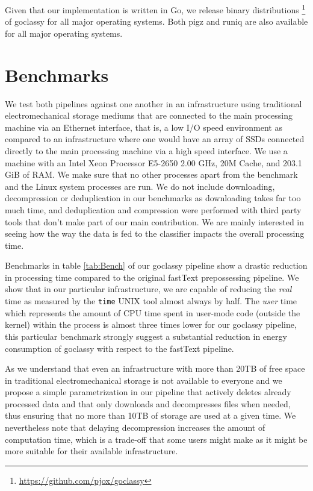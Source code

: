 Given that our implementation is written in Go, we release binary distributions \footnote{\url{https://github.com/pjox/goclassy}} of goclassy for all major operating systems. Both pigz and runiq are also available for all major operating systems.

\section{Benchmarks}

We test both pipelines against one another in an infrastructure using traditional electromechanical storage mediums that are connected to the main processing machine via an Ethernet interface, that is, a low I/O speed environment as compared to an infrastructure where one would have an array of SSDs connected directly to the main processing machine via a high speed interface. We use a machine with an Intel\textsuperscript{\textregistered} Xeon\textsuperscript{\textregistered} Processor E5-2650 2.00 GHz, 20M Cache, and 203.1 GiB of RAM. We make sure that no other processes apart from the benchmark and the Linux system processes are run. We do not include downloading, decompression or deduplication in our benchmarks as downloading takes far too much time, and deduplication and compression were performed with third party tools that don't make part of our main contribution. We are mainly interested in seeing how the way the data is fed to the classifier impacts the overall processing time.

Benchmarks in table \ref{tab:Bench} of our goclassy pipeline show a drastic reduction in processing time compared to the original fastText prepossessing pipeline. We show that in our particular infrastructure, we are capable of reducing the \emph{real} time as measured by the \texttt{time} UNIX tool almost always by half. The \emph{user} time which represents the amount of CPU time spent in user-mode code (outside the kernel) within the process is almost three times lower for our goclassy pipeline, this particular benchmark strongly suggest a substantial reduction in energy consumption of goclassy with respect to the fastText pipeline.

As we understand that even an infrastructure with more than 20TB of free space in traditional electromechanical storage is not available to everyone and we propose a simple parametrization in our pipeline that actively deletes already processed data and that only downloads and decompresses files when needed, thus ensuring that no more than 10TB of storage are used at a given time. We nevertheless note that delaying decompression increases the amount of computation time, which is a trade-off that some users might make as it might be more suitable for their available infrastructure.

